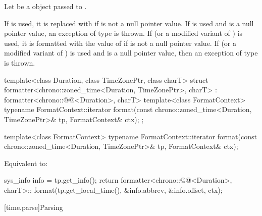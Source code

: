 \begin{itemdescr}
\pnum
Let  be a  object
passed to .

\pnum
\remarks
If  is used,
it is replaced with 
if  is not a null pointer value.
If  is used
and  is a null pointer value,
an exception of type  is thrown.
If  (or a modified variant of ) is used,
it is formatted with the value of 
if  is not a null pointer value.
If  (or a modified variant of ) is used
and  is a null pointer value,
then an exception of type  is thrown.
\end{itemdescr}

%
\begin{codeblock}
template<class Duration, class TimeZonePtr, class charT>
struct formatter<chrono::zoned_time<Duration, TimeZonePtr>, charT>
    : formatter<chrono::@@<Duration>, charT> {
  template<class FormatContext>
    typename FormatContext::iterator
      format(const chrono::zoned_time<Duration, TimeZonePtr>& tp, FormatContext& ctx);
};
\end{codeblock}

%
\begin{itemdecl}
template<class FormatContext>
  typename FormatContext::iterator
    format(const chrono::zoned_time<Duration, TimeZonePtr>& tp, FormatContext& ctx);
\end{itemdecl}

\begin{itemdescr}
\pnum
\effects
Equivalent to:
\begin{codeblock}
sys_info info = tp.get_info();
return formatter<chrono::@@<Duration>, charT>::
         format({tp.get_local_time(), &info.abbrev, &info.offset}, ctx);
\end{codeblock}
\end{itemdescr}

%

[time.parse]{Parsing}

%

